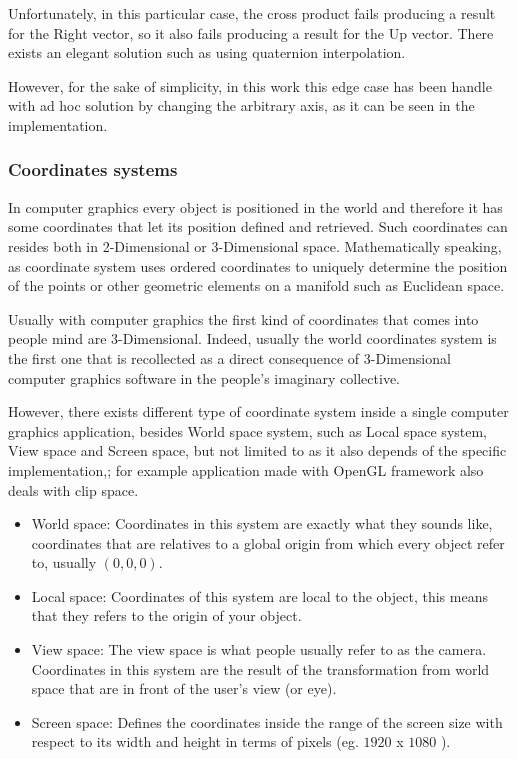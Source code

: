 \documentclass[12pt,a4paper]{extarticle}
\begin{document}
Unfortunately, in this particular case, the cross product fails producing a result for the Right vector, so it also fails producing a result for the Up vector. There exists an elegant solution such as using quaternion interpolation. 

However, for the sake of simplicity, in this work this edge case has been handle with ad hoc solution by changing the arbitrary axis, as it can be seen in the implementation.
\subsubsection{Coordinates systems}
In computer graphics every object is positioned in the world and therefore it has some coordinates that let its position defined and retrieved. Such coordinates can resides both in 2-Dimensional or 3-Dimensional space. Mathematically speaking, as coordinate system uses ordered coordinates to uniquely determine the position of the points or other geometric elements on a manifold such as Euclidean space. %

Usually with computer graphics the first kind of coordinates that comes into people mind are 3-Dimensional. Indeed, usually the world coordinates system is the first one that is recollected as a direct consequence of 3-Dimensional computer graphics software in the people's imaginary collective.


However, there exists different type of coordinate system inside a single computer graphics application, besides World space system, such as Local space system, View space and Screen space, but not limited to as it also depends of the specific implementation,; for example application made with OpenGL framework also deals with clip space.
\begin{itemize}
\item World space: Coordinates in this system are exactly what they sounds like, coordinates that are relatives to a global origin from which every object refer to, usually $(0,0,0)$.
\item Local space: Coordinates of this system are local to the object, this means that they refers to the origin of your object.
\item View space: The view space is what people usually refer to as the camera. Coordinates in this system are the result of the transformation from world space that are in front of the user's view (or eye).
\item Screen space: Defines the coordinates inside the range of the screen size with respect to its width and height in terms of pixels (eg. $1920$ x $1080$ ).
\end{itemize}
\end{document}
